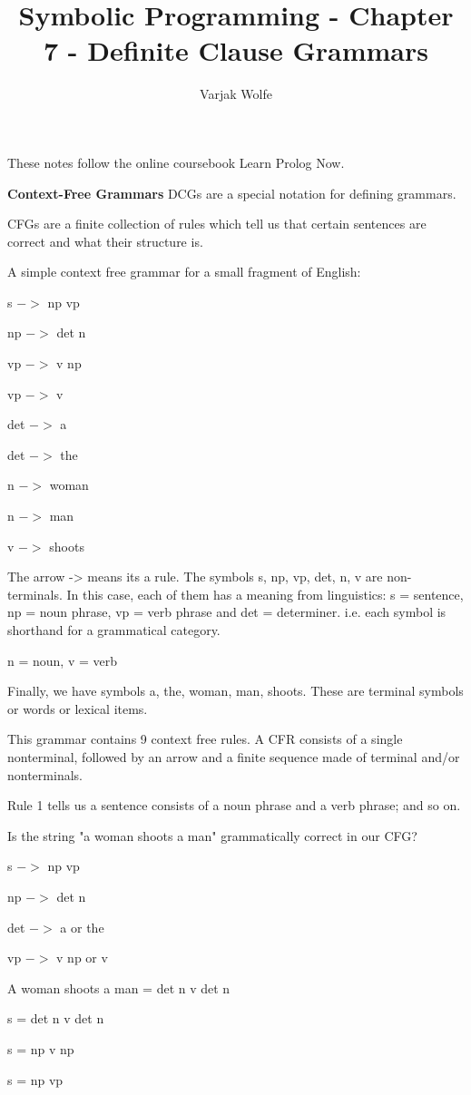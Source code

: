\documentclass{article}
\title{Symbolic Programming -  Chapter 7 - Definite Clause Grammars}
\author{Varjak Wolfe}
\begin{document}
\maketitle

These notes follow the online coursebook Learn Prolog Now.

\textbf{Context-Free Grammars}
DCGs are a special notation for defining grammars.

CFGs are a finite collection of rules which tell us that certain sentences are correct and what their structure is.

A simple context free grammar for a small fragment of English:

s  $->$   np  vp

np  $->$   det  n

vp  $->$   v  np

vp  $->$   v

det  $->$  a

det  $->$  the

n  $->$  woman

n  $->$  man

v  $->$  shoots 


The arrow -> means its a rule. The symbols s, np, vp, det, n, v are non-terminals. In this case, each of them has a meaning from linguistics: s = sentence, np = noun phrase, vp = verb phrase and det = determiner. i.e. each symbol is shorthand for a grammatical category. 

n = noun, v = verb

Finally, we have symbols a, the, woman, man, shoots. These are terminal symbols or words or lexical items.

This grammar contains 9 context free rules. A CFR consists of a single nonterminal, followed by an arrow and a finite sequence made of terminal and/or nonterminals.

Rule 1 tells us a sentence consists of a noun phrase and a verb phrase; and so on.

Is the string "a woman shoots a man" grammatically correct in our CFG?

s $->$  np vp

np $->$  det n

det $->$  a or the

vp $->$ v np or v

A woman shoots a man = det n v det n

s = det n v det n

s = np v np

s = np vp
\end{document}
